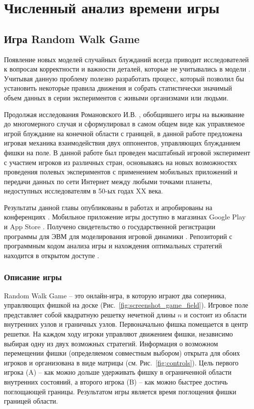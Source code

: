 \chapter{Численный анализ времени игры}\label{ch:ch3}


\section{Игра Random Walk Game}\label{sec:ch3/sec1}

Появление новых моделей случайных блужданий всегда приводит исследователей к вопросам корректности и важности деталей, которые не учитывались в модели \cite{pyke_understanding_2015, lascala-gruenewald_sensory_2019}. Учитывая данную проблему полезно разработать процесс, который позволил бы установить некоторые правила движения и собрать статистически значимый объем данных в серии экспериментов с живыми организмами или людьми. 

Продолжая исследования Романовского И.В. \cite{romanovsky_1961}, обобщившего игры на выживание до многомерного случая и сформулировал в самом общем виде как управляемое игрой блуждание на конечной области с границей, в данной работе предложена игровая механика взаимодействия двух оппонентов, управляющих блужданием фишки на поле. В данной работе был проведен масштабный игровой эксперимент с участием игроков из различных стран, основываясь на новых возможностях проведения полевых экспериментов с применением мобильных приложений и передачи данных по сети Интернет между любыми точками планеты, недоступных исследователям в 50-ых годах XX века. 

Результаты данной главы опубликованы в работах \cite{bib3,bib4} и апробированы на конференциях \cite{confbib1,confbib2,confbib3,confbib4}. Мобильное приложение игры доступно в магазинах Google Play \cite{googleplay} и App Store \cite{applestore}. Получено свидетельство о государственной регистрации программы для ЭВМ для моделирования игровой динамики \cite{progbib1}. Репозиторий с программным кодом анализа игры и нахождения оптимальных стратегий находится в открытом доступе \cite{RWAnalyzer}. 

\subsection{Описание игры}\label{subsec:ch3/sec1/sub1}

Random Walk Game -- это онлайн-игра, в которую играют два соперника, управляющих фишкой на доске (Рис.~\cref{fig:screenshot_game_field}). Игровое поле представляет собой квадратную решетку нечетной длины $n$ и состоит из области внутренних узлов и граничных узлов. Первоначально фишка помещается в центр решетки. На каждом ходу игроки управляют движением фишки, независимо выбирая одну из двух возможных стратегий. Информация о возможном перемещении фишки (определяемом совместным выбором) открыта для обоих игроков и организована в виде матрицы (см. Рис.~\cref{fig:controls}). Цель первого игрока (A) -- как можно дольше удерживать фишку в ограниченной области внутренних состояний, а второго игрока (B) -- как можно быстрее достичь поглощающей границы. Результатом игры является время поглощения фишки границей области.
    
